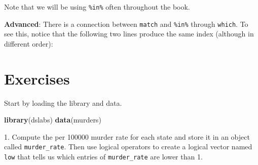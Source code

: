 \documentclass[
]{krantz}
\newenvironment{Shaded}{\begin{snugshade}}{\end{snugshade}}
\newcommand{\CommentTok}[1]{\textcolor[rgb]{0.37,0.37,0.37}{\textit{#1}}}
\newcommand{\DecValTok}[1]{\textcolor[rgb]{0.06,0.06,0.06}{#1}}
\newcommand{\KeywordTok}[1]{\textcolor[rgb]{0.27,0.27,0.27}{\textbf{#1}}}
\newcommand{\NormalTok}[1]{#1}
\newcommand{\OperatorTok}[1]{\textcolor[rgb]{0.43,0.43,0.43}{\textbf{#1}}}
\newcommand{\StringTok}[1]{\textcolor[rgb]{0.5,0.5,0.5}{#1}}
\begin{document}
Note that we will be using \texttt{\%in\%} often throughout the book.

\textbf{Advanced}: There is a connection between \texttt{match} and \texttt{\%in\%} through \texttt{which}. To see this, notice that the following two lines produce the same index (although in different order):

\begin{Shaded}
\end{Shaded}

\hypertarget{exercises-5}{%
\section{Exercises}\label{exercises-5}}

Start by loading the library and data.

\begin{Shaded}
\begin{Highlighting}[]
\KeywordTok{library}\NormalTok{(dslabs)}
\KeywordTok{data}\NormalTok{(murders)}
\end{Highlighting}
\end{Shaded}

1. Compute the per 100000 murder rate for each state and store it in an object called \texttt{murder\_rate}. Then use logical operators to create a logical vector named \texttt{low} that tells us which entries of \texttt{murder\_rate} are lower than 1.

\begin{Shaded}
\end{Shaded}
\end{document}
